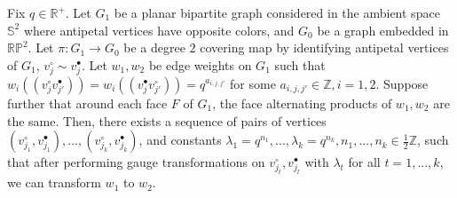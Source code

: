 \documentclass[10pt,a4paper]{amsart}
\begin{document}
\begin{lem}\label{lem: conditions_for_double_gauge}
    Fix $q\in \mathbb{R}^+$. Let $G_1$ be a planar bipartite graph considered in the ambient space $\mathbb{S}^2$ where antipetal vertices have opposite colors, and $G_0$ be a graph embedded in $\mathbb{R}\mathbb{P}^2$. Let $\pi: G_1\rightarrow G_0$ be a degree $2$ covering map by identifying antipetal vertices of $G_1$, $v^\circ_j\sim v^\bullet_j$. Let $w_1,w_2$ be edge weights on $G_1$ such that $w_i((v^\circ_jv^\bullet_{j'}))=w_i((v^\bullet_jv^\circ_{j'})) = q^{a_{i,j,j'}}$ for some $a_{i,j,j'}\in\mathbb{Z}, i=1,2$. Suppose further that around each face $F$ of $G_1$, the face alternating products of $w_1,w_2$ are the same. Then, there exists a sequence of pairs of vertices $(v^\circ_{j_1}, v^\bullet_{j_1}),...,(v^\circ_{j_k}, v^\bullet_{j_k})$, and constants $\lambda_1=q^{n_1},...,\lambda_k = q^{n_k}, n_1,...,n_k\in \frac{1}{2}\mathbb{Z}$, such that after performing gauge transformations on $v^\circ_{j_t}, v^\bullet_{j_t}$ with $\lambda_t$ for all $t=1,...,k$, we can transform $w_1$ to $w_2$. 
\end{lem}
\end{document}
